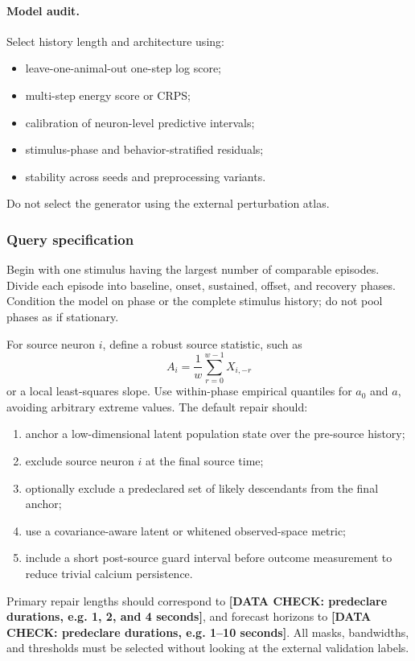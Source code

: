 \documentclass{article}
\newcommand{\dataplaceholder}[1]{%
  \textcolor{placeholderred}{\textbf{[DATA CHECK: #1]}}}
\theoremstyle{remark}
\begin{document}
\paragraph{Model audit.}
Select history length and architecture using:
\begin{itemize}[leftmargin=1.5em]
  \item leave-one-animal-out one-step log score;
  \item multi-step energy score or CRPS;
  \item calibration of neuron-level predictive intervals;
  \item stimulus-phase and behavior-stratified residuals;
  \item stability across seeds and preprocessing variants.
\end{itemize}
Do not select the generator using the external perturbation atlas.

\subsubsection{Query specification}

Begin with one stimulus having the largest number of comparable episodes.
Divide each episode into baseline, onset, sustained, offset, and recovery
phases. Condition the model on phase or the complete stimulus history; do not
pool phases as if stationary.

For source neuron \(i\), define a robust source statistic, such as
\[
  A_i
  =
  \frac{1}{w}
  \sum_{r=0}^{w-1}X_{i,-r}
\]
or a local least-squares slope. Use within-phase empirical quantiles for
\(a_0\) and \(a\), avoiding arbitrary extreme values. The default repair
should:
\begin{enumerate}[leftmargin=1.5em]
  \item anchor a low-dimensional latent population state over the pre-source
  history;
  \item exclude source neuron \(i\) at the final source time;
  \item optionally exclude a predeclared set of likely descendants from the
  final anchor;
  \item use a covariance-aware latent or whitened observed-space metric;
  \item include a short post-source guard interval before outcome
  measurement to reduce trivial calcium persistence.
\end{enumerate}

Primary repair lengths should correspond to
\dataplaceholder{predeclare durations, e.g. 1, 2, and 4 seconds}, and
forecast horizons to
\dataplaceholder{predeclare durations, e.g. 1--10 seconds}.
All masks, bandwidths, and thresholds must be selected without looking at the
external validation labels.
\end{document}
